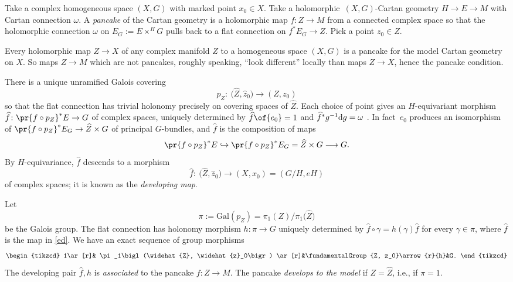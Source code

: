 \documentclass[10pt,a4paper]{amsart}
\numberwithin{equation}{section}
\newcommand{\amal}[3]{\ensuremath{{#1} \mathbin{\times^{#2}} \! #3}}
\begin{document}
Take a complex homogeneous space $(X, G)$ with marked point $x_0 \in X$.
Take a holomorphic~$(X, G)$-Cartan geometry $H \longrightarrow
E \to M$ with Cartan connection $\omega$.
A \emph{pancake} of the Cartan geometry is a holomorphic map $f \colon Z \longrightarrow
 M$ from a connected complex space so that the holomorphic connection $\omega$ on $E_G := \amal{E}{H}{G}$ pulls back to a flat
connection on $f^* E_G \to Z$. Pick a point $z_0 \in Z$.
\begin{Example}
Every holomorphic map $Z\to X$ of any complex manifold $Z$ to a homogeneous space $(X,G)$ is a pancake for the model Cartan geometry on $X$.
So maps $Z\to M$ which are not pancakes, roughly speaking, ``look different'' locally than maps $Z\to X$, hence the pancake condition.
\end{Example}
There is a unique unramified Galois covering
\[
p_Z \colon \ \big(\widehat{Z}, \widehat{z}_0\big) \to (Z, z_0)
\]
so that the flat connection has trivial holonomy precisely on covering spaces of $\widehat{Z}$.
Each choice of point  gives an $H$-equivariant morphism $\widehat{f} \colon
 \pr{f \circ p_Z}^*E \to G$ of complex spaces, uniquely determined by
$
\widehat{f}\of{e_0} = 1
$
and $\widehat{f}^* g^{-1} {\rm d}g = \omega$ \cite[Section 2.3]{Biswas.McKay:2016}. In fact~$e_0$ produces an
isomorphism of $\pr{f \circ p_Z}^*E_G \to \widehat{Z}\times G$ of principal $G$-bundles, and
$\widehat{f}$ is the composition of maps
\[
\pr{f \circ p_Z}^*E \hookrightarrow \pr{f \circ p_Z}^*E_G = \widehat{Z}\times G \longrightarrow G.
\]
By $H$-equivariance, $\widehat{f}$ descends to a morphism
\begin{equation}\label{ed}
\widehat{f} \colon \ \big(\widehat{Z}, \widehat{z}_0\big)
\to (X, x_0) = (G/H, eH)
\end{equation}
of complex spaces; it is known as the \emph{developing map}.

Let
\[
\pi := \text{Gal}(p_Z) = \pi_1(Z)/\pi_1\bigl(\widehat Z\bigr)
\]
be the Galois group. The flat connection has holonomy morphism
$
h \colon \pi \to G
$
uniquely determined by $\widehat{f}\circ\gamma = h(\gamma)\widehat{f}$ for every $\gamma \in \pi$, where $\widehat{f}$ is the map in \eqref{ed}.
We have an exact sequence of group morphisms
\[
\begin{tikzcd}
1\ar[r]& \pi_1\bigl(\widehat{Z}, \widehat{z}_0\bigr) \ar[r]&\fundamentalGroup{Z, z_0}\arrow{r}{h}&G.
\end{tikzcd}
\]
The developing pair $\widehat{f}, h$ is \emph{associated} to the pancake $f \colon Z \to M$.
The pancake \emph{develops to the model} if $Z = \widehat{Z}$, i.e., if $\pi = 1$.
\end{document}
